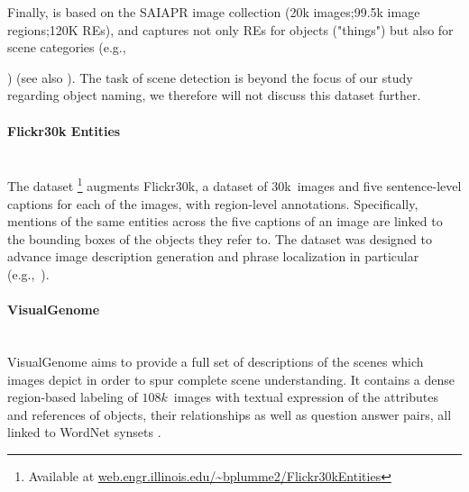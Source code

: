 Finally,  is based on the SAIAPR image collection \cite{Grubinger2006} (20k images;99.5k image regions;120K REs), and captures not only REs for objects ("things") but also for scene categories (e.g.,{) (see also \cite{hu2015,mao2016generation}). 
The task of scene detection is beyond the focus of our study regarding object naming, we therefore will not discuss this dataset further.

\paragraph{Flickr30k Entities}~\\
The \flickr dataset \cite{plummer2015flickr30kentities}\footnote{Available at  \url{web.engr.illinois.edu/~bplumme2/Flickr30kEntities}}  augments Flickr30k, a dataset of 30k~images and five sentence-level captions for each of the images, with region-level annotations. 
Specifically, mentions of the same entities across the five captions of an image are linked to the bounding boxes of the objects they refer to. 
The dataset was designed to advance image description generation and phrase localization in particular (e.g.,~\cite{rohrbach2016grounding,plummer2017phrase,yeh2018unsupervised}). 
%
%

\paragraph{VisualGenome}~\\
VisualGenome \cite{krishna2016visualgenome} aims to provide a full set of descriptions of the scenes which images depict in order to spur complete scene understanding. 
It contains a dense region-based labeling of $108k$~images with textual expression of the attributes and references of objects, their relationships as well as question answer pairs, all linked to WordNet synsets \cite[see below]{fellbaum1998wordnet}. 

}
